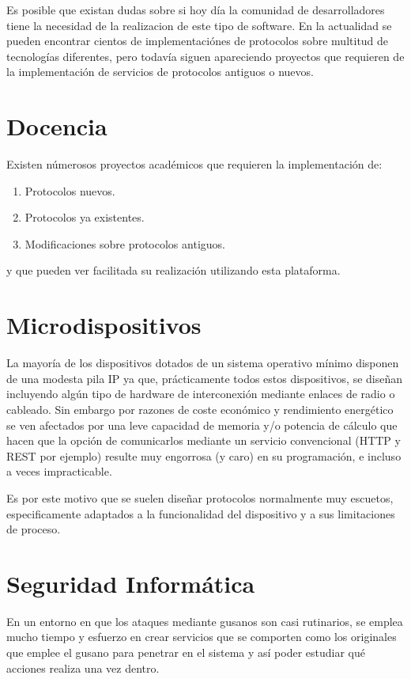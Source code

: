 \documentclass[a4paper,spanish,12pt]{book}
\begin{document}
Es posible que existan dudas sobre si hoy día la comunidad de desarrolladores tiene la necesidad de la realizacion de este tipo de software. En la actualidad se pueden encontrar cientos de implementaciónes de protocolos sobre multitud de tecnologías diferentes, pero todavía siguen apareciendo proyectos que requieren de la implementación de servicios de protocolos antiguos o nuevos.

\section{Docencia}
Existen númerosos proyectos acad\'emicos que requieren la implementaci\'on de:
\begin{enumerate}
	\item Protocolos nuevos.
	\item Protocolos ya existentes.
	\item Modificaciones sobre protocolos antiguos. 
\end{enumerate}

y que pueden ver facilitada su realización utilizando esta plataforma.

\section{Microdispositivos}
La mayor\'ia de los dispositivos dotados de un sistema operativo m\'inimo disponen de una modesta pila IP ya que, prácticamente todos estos dispositivos, se dise\~{n}an incluyendo algún tipo de hardware de interconexi\'on mediante enlaces de radio o cableado. Sin embargo por razones de coste económico y rendimiento energ\'etico se ven afectados por una leve capacidad de memoria y/o potencia de c\'alculo que hacen que la opción de comunicarlos mediante un servicio convencional (HTTP y REST por ejemplo) resulte muy engorrosa (y caro) en su programaci\'on, e incluso a veces impracticable.

Es por este motivo que se suelen dise\~{n}ar protocolos normalmente muy escuetos, especificamente adaptados a la funcionalidad del dispositivo y a sus limitaciones de proceso.

\section{Seguridad Inform\'atica}
En un entorno en que los ataques mediante gusanos son casi rutinarios, se emplea mucho tiempo y esfuerzo en crear servicios que se comporten como los originales que emplee el gusano para penetrar en el sistema y as\'i poder estudiar qué acciones realiza una vez dentro.
\end{document}

